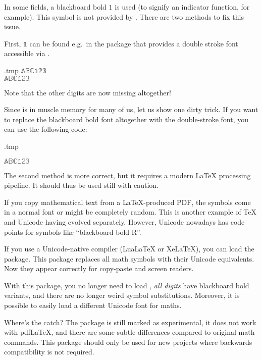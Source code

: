 In some fields, a blackboard bold $1$ is used (to signify an indicator function, for example).
This symbol is not provided by .
There are two methods to fix this issue.

First, $\mathds 1$ can be found e.g.\ in the  package
that provides a double stroke font accessible via .
%
\begin{VerbatimOut}{\jobname.tmp}
$\mathbb{ABC123}$\\
$\mathds{ABC123}$
\end{VerbatimOut}
\ShowExample
%
Note that the other digits are now missing altogether!

Since  is in muscle memory for many of us, let us show one dirty trick.
If you want to replace the blackboard bold font altogether with the double-stroke font,
you can use the following code:
%
\begin{VerbatimOut}{\jobname.tmp}
\DeclareCommandCopy{\mathbb}{\mathds}

$\mathbb{ABC123}$
\end{VerbatimOut}
\ShowExample


The second method is more correct,
but it requires a modern \LaTeX{} processing pipeline.
It should thus be used still with caution.

\begin{latexthree}\label{rem:math unicode}
If you copy mathematical text from a \LaTeX-produced PDF,
the symbols come in a normal font or might be completely random.
This is another example of \TeX{} and Unicode having evolved separately.
However, Unicode nowadays has code points for symbols like ``blackboard bold R''.

If you use a Unicode-native compiler (LuaLaTeX or XeLaTeX),
you can load the  package.
This package replaces all math symbols with their Unicode equivalents.
Now they appear correctly for copy-paste and screen readers.

With this package, you no longer need to load ,
\emph{all digits} have blackboard bold variants,
and there are no longer weird symbol substitutions.
Moreover, it is possible to easily load a different Unicode font for maths.

Where's the catch?
The package is still marked as experimental,
it does not work with pdfLaTeX,
and there are some subtle differences compared to original math commands.
This package should only be used for new projects where backwards compatibility is not required.
\end{latexthree}


